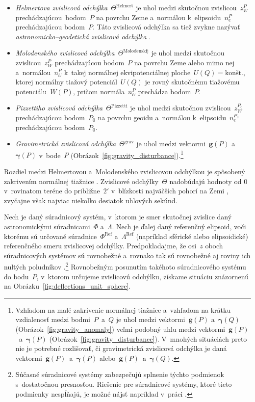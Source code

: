 \documentclass[a4paper, 12pt]{book}
\let\vec\mathbf
\begin{document}
\begin{itemize}
\item \emph{Helmertova zvislicová odchýlka}~$\Theta^\mathrm{Helmert}$ je uhol 
medzi skutočnou zvislicou~$z_W^P$ prechádzajúcou~bodom~$P$ na povrchu Zeme 
a~normálou k~elipsoidu~$n_e^P$ prechádzajúcou bodom~$P$.  Táto zvislicová 
odchýlka sa tiež zvykne nazývať \textit{astronomicko--geodetická zvislicová 
odchýlka} \parencite{Jekeli1999b}.

\item \emph{Molodenského zvislicová odchýlka}~$\Theta^\mathrm{Molodenskij}$ je 
uhol medzi skutočnou zvislicou~$z_W^P$ prechádzajúcou bodom~$P$ na povrchu Zeme 
alebo mimo nej a~normálou~$n_U^P$ k~takej normálnej ekvipotenciálnej 
ploche~$U(Q) = \textrm{kon\v{s}t.}$, ktorej normálny tiažový potenciál~$U(Q)$ 
je rovný skutočnému tiažovému potenciálu~$W(P)$, pričom normála~$n_U^P$ 
prechádza bodom~$P$.

\item \emph{Pizzettiho zvislicová odchýlka}~$\Theta^\mathrm{Pizzetti}$ je uhol 
medzi skutočnou zvislicou~$z_W^{P_0}$ prechádzajúcou bodom~$P_0$ na povrchu 
geoidu a~normálou k~elipsoidu~$n_e^{P_0}$ prechádzajúcou bodom~$P_0$.

\item \emph{Gravimetrická zvislicová odchýlka}~$\Theta^\mathrm{grav}$ je uhol 
medzi vektormi~$\vec g(P)$ a~$\boldsymbol\gamma(P)$ v~bode~$P$ 
(Obrázok~\ref{fig:gravity_disturbance}).\footnote{Vzhľadom na malé zakrivenie 
normálnej tiažnice a~vzhľadom na krátku vzdialenosť medzi bodmi~$P$~a~$Q$ je 
uhol medzi vektormi~$\vec g(P)$ a~$\boldsymbol\gamma(Q)$ 
(Obrázok~\ref{fig:gravity_anomaly}) veľmi podobný uhlu medzi vektormi~$\vec 
g(P)$~a~$\boldsymbol\gamma(P)$ (Obrázok~\ref{fig:gravity_disturbance}).  
V~mnohých situáciách preto nie je potrebné rozlišovať, či gravimetrická 
zvislicová odchýlka je daná vektormi~$\vec g(P)$~a~$\boldsymbol\gamma(P)$ 
alebo~$\vec g(P)$~a~$\boldsymbol\gamma(Q)$.}
\end{itemize}
%
Rozdiel medzi Helmertovou a~Molodenského zvislicovou odchýlkou je spôsobený 
zakrivením normálnej tiažnice \parencite{Jekeli1999b}.  Zvislicové 
odchýlky~$\Theta$ nadobúdajú hodnoty od $0$ v~rovinatom teréne do 
približne~$2'$ v~blízkosti najväčších pohorí na Zemi \parencite{GGMplus}, 
zvyčajne však najviac niekoľko desiatok uhlových sekúnd.

Nech je daný súradnicový systém, v~ktorom je smer skutočnej zvislice daný 
astronomickými súradnicami~$\Phi$ a~$\Lambda$.  Nech je ďalej daný referenčný 
elipsoid, voči ktorému sú určované súradnice~$\Phi^{\mathrm{Ref}}$ 
a~$\Lambda^{\mathrm{Ref}}$ (napríklad sférické alebo elipsoidické) referenčného 
smeru zvislicovej odchýlky.  Predpokladajme, že osi~$z$ oboch súradnicových 
systémov sú rovnobežné a~rovnako tak sú rovnobežné aj roviny ich nultých 
poludníkov \parencite{TorgeGeodesy}.\footnote{Súčasné súradnicové systémy 
zabezpečujú splnenie týchto podmienok s~dostatočnou presnosťou.  Riešenie pre 
súradnicové systémy, ktoré tieto podmienky nespĺňajú, je možné nájsť napríklad 
v~práci \textcite{Pick2000}.}  Rovnobežným posunutím takéhoto súradnicového 
systému do bodu~$P$, v~ktorom určujeme zvislicovú odchýlku, získame situáciu 
znázornenú na Obrázku~\ref{fig:deflections_unit_sphere}.
\end{document}
